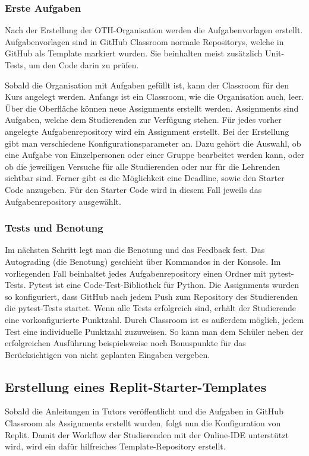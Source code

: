 \subsubsection{Erste Aufgaben}\label{classroom-erste-aufgaben}
Nach der Erstellung der OTH-Organisation werden die Aufgabenvorlagen erstellt.
Aufgabenvorlagen sind in GitHub Classroom normale Repositorys, welche in GitHub
als Template markiert wurden. Sie beinhalten meist zusätzlich Unit-Tests, um den
Code darin zu prüfen.

Sobald die Organisation mit Aufgaben gefüllt ist, kann der
Classroom für den Kurs angelegt werden. Anfangs ist ein Classroom, wie die
Organisation auch, leer. Über die Oberfläche können neue Assignments
erstellt werden. Assignments sind Aufgaben, welche dem Studierenden zur
Verfügung stehen. Für jedes vorher angelegte Aufgabenrepository wird ein
Assignment erstellt. Bei der Erstellung gibt man verschiedene
Konfigurationsparameter an. Dazu gehört die Auswahl, ob eine Aufgabe von
Einzelpersonen oder einer Gruppe bearbeitet werden kann, oder ob die jeweiligen
Versuche für alle Studierenden oder nur für die Lehrenden sichtbar sind. Ferner
gibt es die Möglichkeit eine Deadline, sowie den Starter Code anzugeben. Für den
Starter Code wird in diesem Fall jeweils das Aufgabenrepository ausgewählt.
\parencite{github-assignment-erstellen}

\subsubsection{Tests und Benotung}\label{classroom-tests}
Im nächsten Schritt legt man die Benotung und das Feedback fest. Das Autograding
(die Benotung) geschieht über Kommandos in der Konsole. Im vorliegenden Fall
beinhaltet jedes Aufgabenrepository einen Ordner mit pytest-Tests. Pytest ist
eine Code-Test-Bibliothek für Python. Die Assignments wurden so konfiguriert,
dass GitHub nach jedem Push zum Repository des Studierenden die pytest-Tests
startet. Wenn alle Tests erfolgreich sind, erhält der Studierende eine
vorkonfigurierte Punktzahl. Durch Classroom ist es außerdem möglich, jedem
Test eine individuelle Punktzahl zuzuweisen. So kann man dem Schüler neben der
erfolgreichen Ausführung beispielsweise noch Bonuspunkte für das Berücksichtigen
von nicht geplanten Eingaben vergeben. \parencite{github-assignment-erstellen}

\newpage

\subsection{Erstellung eines Replit-Starter-Templates}\label{replit-template}
Sobald die Anleitungen in Tutors veröffentlicht und die Aufgaben in GitHub
Classroom als Assignments erstellt wurden, folgt nun die Konfiguration von
Replit. Damit der Workflow der Studierenden mit der Online-IDE unterstützt wird,
wird ein dafür hilfreiches Template-Repository erstellt.

